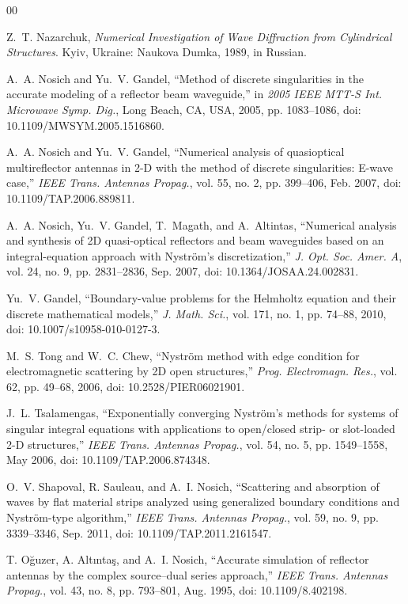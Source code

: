 \documentclass[conference]{IEEEtran}
\begin{document}
\begin{thebibliography}{00}

Z.~T. Nazarchuk, \emph{Numerical Investigation of Wave Diffraction from
Cylindrical Structures}. Kyiv, Ukraine: Naukova Dumka, 1989, in Russian.

A.~A. Nosich and Yu.~V. Gandel, ``Method of discrete singularities in the
accurate modeling of a reflector beam waveguide,'' in \emph{2005 IEEE MTT-S
Int. Microwave Symp. Dig.}, Long Beach, CA, USA, 2005, pp. 1083--1086,
doi: 10.1109/MWSYM.2005.1516860.

A.~A. Nosich and Yu.~V. Gandel, ``Numerical analysis of quasioptical
multireflector antennas in 2-D with the method of discrete singularities:
E-wave case,'' \emph{IEEE Trans. Antennas Propag.}, vol. 55, no. 2,
pp. 399--406, Feb. 2007, doi: 10.1109/TAP.2006.889811.

A.~A. Nosich, Yu.~V. Gandel, T.~Magath, and A.~Altintas, ``Numerical analysis
and synthesis of 2D quasi-optical reflectors and beam waveguides based on an
integral-equation approach with Nystr\"om's discretization,'' \emph{J. Opt.
Soc. Amer. A}, vol. 24, no. 9, pp. 2831--2836, Sep. 2007,
doi: 10.1364/JOSAA.24.002831.

Yu.~V. Gandel, ``Boundary-value problems for the Helmholtz equation and their
discrete mathematical models,'' \emph{J. Math. Sci.}, vol. 171, no. 1,
pp. 74--88, 2010, doi: 10.1007/s10958-010-0127-3.

M.~S. Tong and W.~C. Chew, ``Nystr\"om method with edge condition for
electromagnetic scattering by 2D open structures,'' \emph{Prog. Electromagn.
Res.}, vol. 62, pp. 49--68, 2006, doi: 10.2528/PIER06021901.

J.~L. Tsalamengas, ``Exponentially converging Nystr\"om's methods for systems
of singular integral equations with applications to open/closed strip- or
slot-loaded 2-D structures,'' \emph{IEEE Trans. Antennas Propag.}, vol. 54,
no. 5, pp. 1549--1558, May 2006, doi: 10.1109/TAP.2006.874348.

O.~V. Shapoval, R. Sauleau, and A.~I. Nosich, ``Scattering and absorption of
waves by flat material strips analyzed using generalized boundary conditions
and Nystr\"om-type algorithm,'' \emph{IEEE Trans. Antennas Propag.}, vol. 59,
no. 9, pp. 3339--3346, Sep. 2011, doi: 10.1109/TAP.2011.2161547.

T. O\u{g}uzer, A. Alt\i nta\c{s}, and A.~I. Nosich, ``Accurate simulation of
reflector antennas by the complex source--dual series approach,'' \emph{IEEE
Trans. Antennas Propag.}, vol. 43, no. 8, pp. 793--801, Aug. 1995,
doi: 10.1109/8.402198.


\end{thebibliography}
\end{document}
